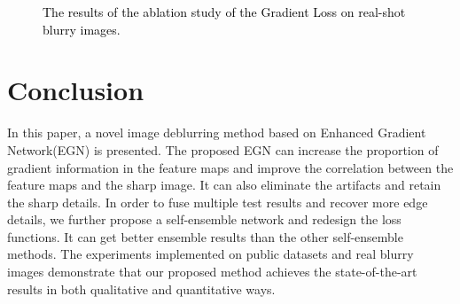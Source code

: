 \begin{sloppypar}
\begin{figure}
\begin{tabular}{ccc}
        \end{tabular}
        
        \caption{\textcolor{black}{The  results of the ablation study of the Gradient Loss on real-shot blurry images.}}
        \label{figure14}
        \vspace{-0.5em}
\end{figure}

\section{Conclusion}
In this paper, a novel image deblurring method based on Enhanced Gradient Network(EGN) is presented. The proposed EGN can increase the proportion of gradient information in the feature maps and improve the correlation between the feature maps and the sharp image. It can also eliminate the artifacts and retain the sharp details. In order to fuse multiple test results and recover more edge details, we further propose a self-ensemble network and redesign the loss functions. It can get better ensemble results than the other self-ensemble methods. The experiments implemented on public datasets and real blurry images demonstrate that our proposed method achieves the state-of-the-art results in both qualitative and quantitative ways.



%
%






\end{sloppypar}
